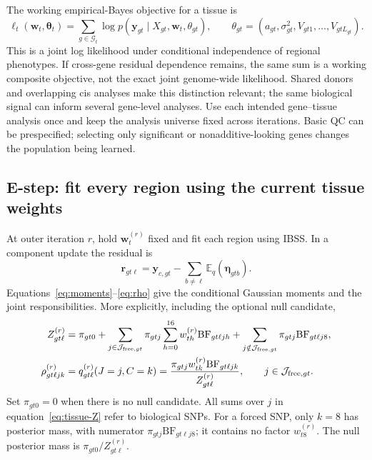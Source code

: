 \documentclass[11pt]{article}
\newcommand{\BF}{\mathrm{BF}}
\newcommand{\E}{\mathbb E}
\begin{document}
The working empirical-Bayes objective for a tissue is
\begin{equation}
 \ell_t(\mathbf w_t,\boldsymbol\theta_t)
 =\sum_{g\in\mathcal G_t}
   \log p(\mathbf y_{gt}\mid X_{gt},\mathbf w_t,\theta_{gt}),
 \qquad
 \theta_{gt}=(a_{gt},\sigma^2_{gt},V_{gt1},\ldots,V_{gtL_{gt}}).
 \label{eq:tissue-likelihood}
\end{equation}
This is a joint log likelihood under conditional independence of regional
phenotypes. If cross-gene residual dependence remains, the same sum is a
working composite objective, not the exact joint genome-wide likelihood.
Shared donors and overlapping cis analyses make this distinction relevant;
the same biological signal can inform several gene-level analyses.
Use each intended gene--tissue analysis once and keep the analysis universe
fixed across iterations. Basic QC can be prespecified; selecting only
significant or nonadditive-looking genes changes the population being learned.

\subsection{E-step: fit every region using the current tissue weights}
At outer iteration $r$, hold $\mathbf w_t^{(r)}$ fixed and fit each region
using IBSS. In a component update the residual is
\begin{equation}
 \mathbf r_{gt\ell}
 =\mathbf y_{c,gt}-\sum_{b\ne\ell}\E_q(\boldsymbol\eta_{gtb}).
\end{equation}
Equations~\eqref{eq:moments}--\eqref{eq:rho} give the conditional Gaussian
moments and the joint responsibilities. More explicitly, including the
optional null candidate,
\begin{align}
 Z_{gt\ell}^{(r)}
 &=\pi_{gt0}
   +\sum_{j\in\mathcal J_{{\rm free},gt}}\pi_{gtj}
       \sum_{h=0}^{16}w_{th}^{(r)}\BF_{gt\ell jh}
   +\sum_{j\notin\mathcal J_{{\rm free},gt}}\pi_{gtj}\BF_{gt\ell j8},
 \label{eq:tissue-Z}\\
 \rho_{gt\ell jk}^{(r)}
 &=q_{gt\ell}^{(r)}(J=j,C=k)
   =\frac{\pi_{gtj}w_{tk}^{(r)}\BF_{gt\ell jk}}{Z_{gt\ell}^{(r)}},
       \qquad j\in\mathcal J_{{\rm free},gt}.
 \label{eq:tissue-rho}
\end{align}
Set $\pi_{gt0}=0$ when there is no null candidate. All sums over $j$ in
equation~\eqref{eq:tissue-Z} refer to biological SNPs. For a forced SNP,
only $k=8$ has posterior mass, with numerator
$\pi_{gtj}\BF_{gt\ell j8}$; it contains no factor $w_{t8}^{(r)}$.
The null posterior mass is $\pi_{gt0}/Z_{gt\ell}^{(r)}$.
\end{document}
